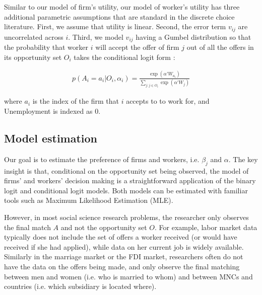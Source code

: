 Similar to our model of firm's utility, our model of worker's utility has three
additional parametric assumptions that are standard in the discrete choice
literature. First, we assume that utility is linear. Second, the error term
$v_{ij}$ are uncorrelated across $i$. Third, we model $v_{ij}$ having a Gumbel
distribution so that the probability that worker $i$ will accept the offer of
firm $j$ out of all the offers in its opportunity set $O_i$ takes the
conditional logit form \citep{Cameron2005}:

\begin{align}
  p(A_i = a_i | O_i, \alpha_i) = \frac{\exp(\alpha'W_{a_i})}{\sum\limits_{j:j \in O_i} \exp(\alpha'W_j)} \label{eq:conditional_probability_of_accept}
\end{align}

where $a_i$ is the index of the firm that $i$ accepts to to work for, and
Unemployment is indexed as 0.

\subsection{Model estimation}

Our goal is to estimate the preference of firms and workers, i.e. $\beta_j$ and
$\alpha$. The key insight is that, conditional on the opportunity set being
observed, the model of firms' and workers' decision making is a straightforward
application of the binary logit and conditional logit models. Both models can be
estimated with familiar tools such as Maximum Likelihood Estimation (MLE).

However, in most social science research problems, the researcher only observes
the final match $A$ and not the opportunity set $O$. For example, labor market
data typically does not include the set of offers a worker received (or would
have received if she had applied), while data on her current job is widely
available. Similarly in the marriage market or the FDI market, researchers often
do not have the data on the offers being made, and only observe the final
matching between men and women (i.e. who is married to whom) and between MNCs
and countries (i.e. which subsidiary is located where).

